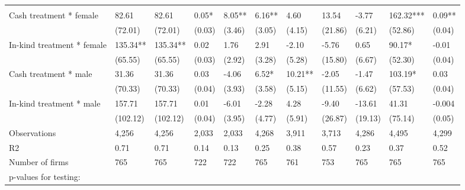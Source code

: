 \documentclass{report}
\begin{document}
\begin{table}[H]
{\begin{tabular}{lllllllllll}
\cmidrule(l{3pt}r{3pt}){2-2} \cmidrule(l{3pt}r{3pt}){3-3} \cmidrule(l{3pt}r{3pt}){4-4} \cmidrule(l{3pt}r{3pt}){5-5} \cmidrule(l{3pt}r{3pt}){6-6} \cmidrule(l{3pt}r{3pt}){7-7} \cmidrule(l{3pt}r{3pt}){8-8} \cmidrule(l{3pt}r{3pt}){9-9} \cmidrule(l{3pt}r{3pt}){10-10} \cmidrule(l{3pt}r{3pt}){11-11}
\addlinespace[0.3em]
\multicolumn{11}{l}{\textbf{Panel A: Males and females}}\\
\hspace{1em}Cash treatment * female & 82.61 & 82.61 & 0.05* & 8.05** & 6.16** & 4.60 & 13.54 & -3.77 & 162.32*** & 0.09**\\
\hspace{1em} & (72.01) & (72.01) & (0.03) & (3.46) & (3.05) & (4.15) & (21.86) & (6.21) & (52.86) & (0.04)\\
\hspace{1em}In-kind treatment * female & 135.34** & 135.34** & 0.02 & 1.76 & 2.91 & -2.10 & -5.76 & 0.65 & 90.17* & -0.01\\
\hspace{1em} & (65.55) & (65.55) & (0.03) & (2.92) & (3.28) & (5.28) & (15.80) & (6.67) & (52.30) & (0.04)\\
\hspace{1em}Cash treatment * male & 31.36 & 31.36 & 0.03 & -4.06 & 6.52* & 10.21** & -2.05 & -1.47 & 103.19* & 0.03\\
\hspace{1em} & (70.33) & (70.33) & (0.04) & (3.93) & (3.58) & (5.15) & (11.55) & (6.62) & (57.53) & (0.04)\\
\hspace{1em}In-kind treatment * male & 157.71 & 157.71 & 0.01 & -6.01 & -2.28 & 4.28 & -9.40 & -13.61 & 41.31 & -0.004\\
\hspace{1em} & (102.12) & (102.12) & (0.04) & (3.95) & (4.77) & (5.91) & (26.87) & (19.13) & (75.14) & (0.05)\\
\hspace{1em}Observations & 4,256 & 4,256 & 2,033 & 2,033 & 4,268 & 3,911 & 3,713 & 4,286 & 4,495 & 4,299\\
\hspace{1em}R2 & 0.71 & 0.71 & 0.14 & 0.13 & 0.25 & 0.38 & 0.57 & 0.23 & 0.37 & 0.52\\
\hspace{1em}Number of firms & 765 & 765 & 722 & 722 & 765 & 761 & 753 & 765 & 765 & 765\\
\hspace{1em}p-values for testing: &  &  &  &  &  &  &  &  &  \vphantom{1}& \\

\end{tabular}}
\end{table}
\end{document}
